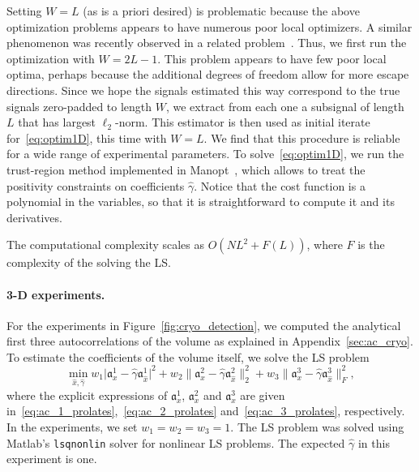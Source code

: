 \documentclass[9pt,twocolumn,twoside,lineno]{pnas-new}
\begin{document}
Setting $W = L$ (as is a priori desired) is problematic because the above optimization problems appears to have numerous poor local optimizers. A similar phenomenon was recently observed in a related problem~\cite{zhang2018structured}.
Thus, we first run the optimization with $W = 2L-1$. This problem appears to have few poor local optima, perhaps because the additional degrees of freedom allow for more escape directions. Since we hope the signals estimated this way correspond to the true signals zero-padded to length $W$, we extract from each one a subsignal of length $L$ that has largest $\ell_2$-norm. This estimator is then used as initial iterate for~\eqref{eq:optim1D}, this time with $W = L$. We find that this procedure is reliable for a wide range of experimental parameters. To solve~\eqref{eq:optim1D}, we run the trust-region method implemented in Manopt~\cite{manopt}, which allows to treat the positivity constraints on coefficients $\hat \gamma$. Notice that the cost function is a polynomial in the variables, so that it is straightforward to compute it and its derivatives.

The computational complexity scales as $O(NL^2 + F(L))$, where $F$ is the complexity of the solving the LS.

\paragraph{3-D experiments.}
For the experiments in Figure~\ref{fig:cryo_detection}, we computed the analytical first three autocorrelations of the volume as explained in Appendix~\ref{sec:ac_cryo}.
To estimate the coefficients of the volume itself, we solve the LS problem
\begin{equation} \label{eq:LS_cryo}
\min_{\hat{x},\hat{\gamma}} w_1 \vert \mathfrak{a}_x^1 - \hat{\gamma}\mathfrak{a}_{\hat{x}}^1 \vert^2 + w_2\| \mathfrak{a}_x^2 - \hat{\gamma}\mathfrak{a}_{\hat{x}}^2 \|_2^2 + w_3\| \mathfrak{a}_x^3 - \hat{\gamma}\mathfrak{a}_{\hat{x}}^3 \|_F^2, 
\end{equation}  
where the explicit expressions of $\mathfrak{a}_x^1$, $\mathfrak{a}_x^2$ and $\mathfrak{a}_x^3$ are given in~\eqref{eq:ac_1_prolates},~\eqref{eq:ac_2_prolates} and~\eqref{eq:ac_3_prolates}, respectively.  
In the experiments, we set $w_1=w_2=w_3=1$. 
The LS problem was solved using Matlab's \texttt{lsqnonlin} solver for nonlinear LS problems. The expected $\hat \gamma$ in this experiment is one. 
\end{document}
